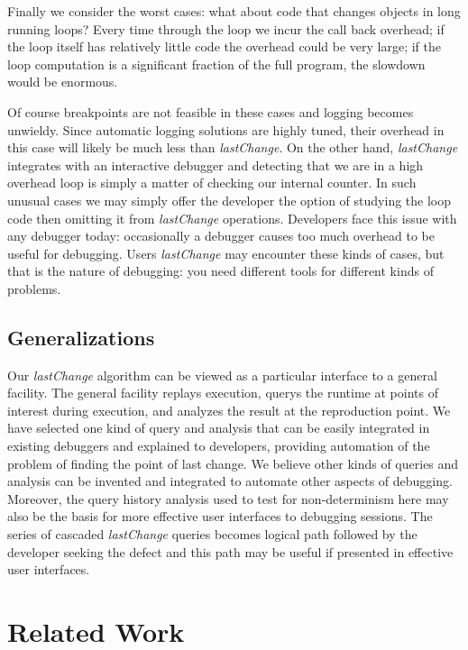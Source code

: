 \documentclass[runningheads,a4paper]{llncs}
\begin{document}
Finally we consider the worst cases: what about code that changes
objects in long running loops? Every time through the loop we incur
the call back overhead; if the loop itself has relatively little code
the overhead could be very large; if the loop computation is a
significant fraction of the full program, the slowdown would be
enormous. 

Of course breakpoints are not feasible in these cases and logging
becomes unwieldy. Since automatic logging solutions are highly tuned,
their overhead in this case will likely be much less than
\textit{lastChange}. On the other hand, \textit{lastChange} integrates
with an interactive debugger and detecting that we are in a high
overhead loop is simply a matter of checking our internal counter. In
such unusual cases we may simply offer the developer the option of
studying the loop code then omitting it from \textit{lastChange}
operations. Developers face this issue with any debugger today: occasionally a
debugger causes too much overhead to be useful for debugging. 
Users \textit{lastChange} may encounter these kinds of cases, but 
that is the nature of debugging: you need different tools for 
different kinds of problems.

\subsection{Generalizations}
Our \textit{lastChange} algorithm can be viewed as a particular interface to a general facility. 
The general facility replays execution, querys the runtime at points of interest during execution,
and analyzes the result at the reproduction point. We have selected one kind of query and analysis
that can be easily integrated in existing debuggers and explained to developers, providing automation of 
the problem of finding the point of last change. We believe other
kinds of queries and analysis can be invented and integrated to automate other aspects of debugging.
Moreover, the query history analysis used to test for non-determinism here may also be the basis for
more effective user interfaces to debugging sessions. The series of cascaded \textit{lastChange} queries becomes 
logical path followed by the developer seeking the defect and this path may be useful if presented in effective user interfaces.

\section{Related Work}
\label{sec:relatedWork}
\end{document}

